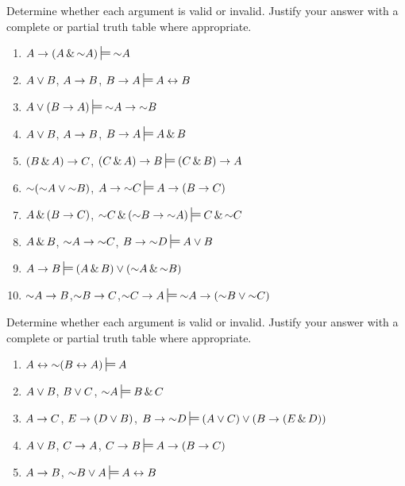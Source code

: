 \noindent\problempart Determine whether each argument is valid or invalid. Justify your answer with a complete or partial truth table where appropriate.
\label{pr.TT.valid} 
\begin{enumerate}
\item $A\eif(A\eand\enot A)\sdtstile{}{}\enot A$%
\item $A \vee B$, $A \rightarrow B$, $B \eif A \sdtstile{}{} A \eiff B$  %
\item $A\eor(B\eif A)\sdtstile{}{}\enot A \eif \enot B$ %
\item $A \vee B$, $A \rightarrow B$, $ B \eif A \sdtstile{}{} A \eand B$ %
\item $(B\,\&\, A)\rightarrow C$, $(C\eand A)\eif B\sdtstile{}{}(C\eand B)\eif A$ %
\item $\mathord{\sim} (\mathord{\sim} A \vee \mathord{\sim} B)$, $A \eif \enot C \sdtstile{}{} A \eif (B \eif C)$ %
\item $A \,\&\, (B \rightarrow C)$, $\enot C \eand (\enot B \eif \enot A)\sdtstile{}{}C \eand \enot C$ %
\item $A \,\&\, B$, $\mathord{\sim} A \rightarrow \mathord{\sim} C$, $B \eif \enot D \sdtstile{}{} A \eor B$ %
\item $A \eif B\sdtstile{}{}(A \eand B) \eor (\enot A \eand \enot B)$ %
\item $\mathord{\sim} A \rightarrow B$,$ \mathord{\sim} B \rightarrow C $,$ \enot C \eif A \sdtstile{}{} \enot A \eif (\enot B \eor \enot C) $%

\end{enumerate}

\noindent\problempart Determine whether each argument is valid or invalid. Justify your answer with a complete or partial truth table where appropriate.
\label{pr.TT.valid} 
\begin{enumerate}
\item $A\eiff\enot(B\eiff A)\sdtstile{}{}A$ %
\item $A\vee B$, $B\vee C$, $\enot A\sdtstile{}{}B \eand C$ %
\item $A \rightarrow C$, $E \rightarrow (D \vee B)$, $B \eif \enot D\sdtstile{}{}(A \eor C) \eor (B \eif (E \eand D))$ %
\item $A \vee B$, $C \rightarrow A$, $C \eif B\sdtstile{}{}A \eif (B \eif C)$ %
\item $A \rightarrow B$, $\enot B \eor A\sdtstile{}{}A \eiff B$ %
\end{enumerate}

